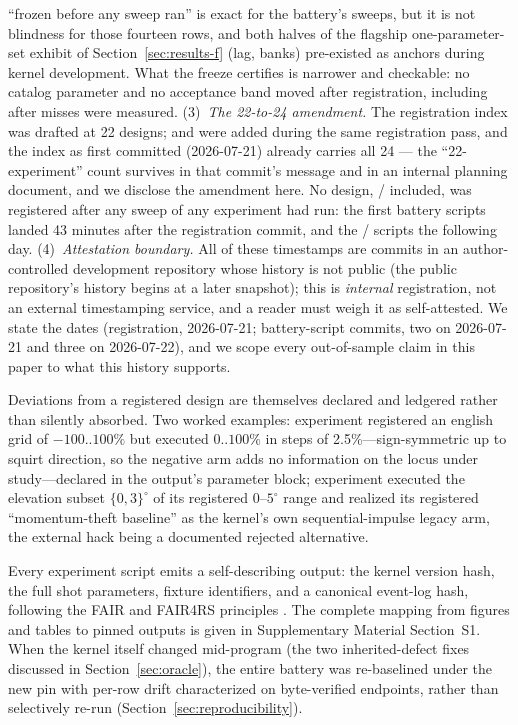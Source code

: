 ``frozen before any sweep ran'' is exact for the battery's sweeps, but
it is not blindness for those fourteen rows, and both halves of the
flagship one-parameter-set exhibit of Section~\ref{sec:results-f} (lag,
banks) pre-existed as anchors during kernel development. What the freeze
certifies is narrower and checkable: no catalog parameter and no
acceptance band moved after registration, including after misses were
measured. (3)~\emph{The 22-to-24 amendment.} The registration index was
drafted at 22 designs;  and  were added during the
same registration pass, and the index as first committed (2026-07-21)
already carries all 24 --- the ``22-experiment'' count survives in that
commit's message and in an internal planning document, and we disclose
the amendment here. No design, / included, was
registered after any sweep of any experiment had run: the first battery
scripts landed 43 minutes after the registration commit, and the
/ scripts the following day. (4)~\emph{Attestation
boundary.} All of these timestamps are commits in an author-controlled
development repository whose history is not public (the public
repository's history begins at a later snapshot); this is \emph{internal}
registration, not an external timestamping service, and a reader must
weigh it as self-attested. We state the dates (registration,
2026-07-21; battery-script commits, two on 2026-07-21 and three on
2026-07-22), and we scope every out-of-sample claim in this paper to
what this history supports.

Deviations from a registered design are themselves declared and ledgered
rather than silently absorbed. Two worked examples: experiment 
registered an english grid of $-100..100\%$ but executed $0..100\%$ in steps
of 2.5\%---sign-symmetric up to squirt direction, so the negative arm adds
no information on the locus under study---declared in the output's parameter
block; experiment  executed the
elevation subset $\{0, 3\}^\circ$ of its registered $0$--$5^\circ$ range and
realized its registered ``momentum-theft baseline'' as the kernel's own
sequential-impulse legacy arm, the external hack being a documented rejected
alternative.

Every experiment script emits a self-describing output: the kernel version
hash, the full shot parameters, fixture identifiers, and a canonical
event-log hash, following the FAIR and FAIR4RS principles
\citep{wilkinson2016fair,chuehong2022fair4rs}. The complete mapping from
figures and tables to pinned outputs is given in
Supplementary Material Section~S1. When the kernel itself changed
mid-program (the two inherited-defect fixes discussed in
Section~\ref{sec:oracle}), the entire battery was re-baselined under the new
pin with per-row drift characterized on byte-verified endpoints, rather than
selectively re-run (Section~\ref{sec:reproducibility}).


